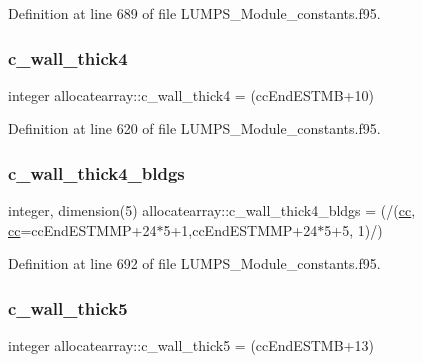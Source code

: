 Definition at line 689 of file L\+U\+M\+P\+S\+\_\+\+Module\+\_\+constants.\+f95.

\mbox{\label{namespaceallocatearray_a00d3e8b6807cad69955658722fb6dc73}} 
\subsubsection{\texorpdfstring{c\+\_\+wall\+\_\+thick4}{c\_wall\_thick4}}
{\footnotesize\ttfamily integer allocatearray\+::c\+\_\+wall\+\_\+thick4 = (cc\+End\+E\+S\+T\+MB+10)}



Definition at line 620 of file L\+U\+M\+P\+S\+\_\+\+Module\+\_\+constants.\+f95.

\mbox{\label{namespaceallocatearray_a044a0c470735dd407e5d5fb0a536540a}} 
\subsubsection{\texorpdfstring{c\+\_\+wall\+\_\+thick4\+\_\+bldgs}{c\_wall\_thick4\_bldgs}}
{\footnotesize\ttfamily integer, dimension(5) allocatearray\+::c\+\_\+wall\+\_\+thick4\+\_\+bldgs = (/(\hyperlink{namespaceallocatearray_ac863c81704eb507dee10f5e10741e10c}{cc}, \hyperlink{namespaceallocatearray_ac863c81704eb507dee10f5e10741e10c}{cc}=cc\+End\+E\+S\+T\+M\+MP+24$\ast$5+1,cc\+End\+E\+S\+T\+M\+MP+24$\ast$5+5, 1)/)}



Definition at line 692 of file L\+U\+M\+P\+S\+\_\+\+Module\+\_\+constants.\+f95.

\mbox{\label{namespaceallocatearray_a5730c33e608715fe74f0b0f0549c1634}} 
\subsubsection{\texorpdfstring{c\+\_\+wall\+\_\+thick5}{c\_wall\_thick5}}
{\footnotesize\ttfamily integer allocatearray\+::c\+\_\+wall\+\_\+thick5 = (cc\+End\+E\+S\+T\+MB+13)}



